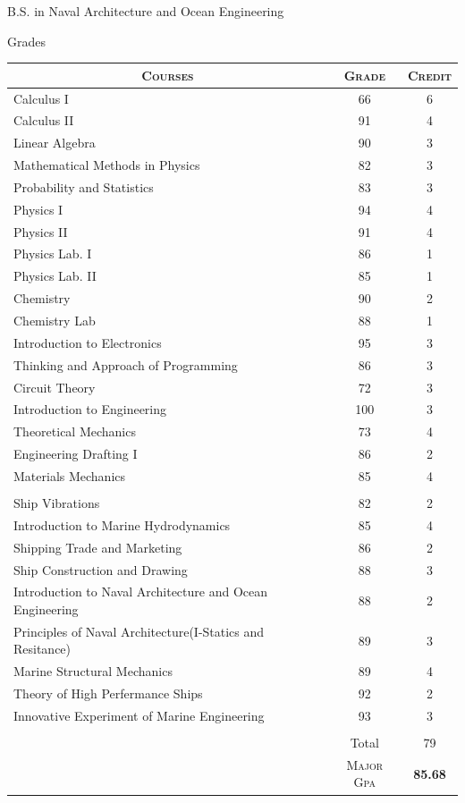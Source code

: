 \documentclass[a4paper,10pt]{article}
\begin{document}
\newpage
\par{\centering\Large \hypertarget{grds}{B.S. in Naval Architecture and Ocean Engineering}\par}\large{\centering Grades\par}\normalsize
\begin{center}
\begin{tabular}{lcc}
\multicolumn{1}{c}{\textsc{Courses}}&\textsc{Grade}&\textsc{Credit}\\ \hline
Calculus I	&66&	6\\
Calculus II	&91&	4\\
Linear Algebra	&90&	3\\
Mathematical Methods in Physics	&82&	3\\
Probability and Statistics	&83&	3\\
Physics I	&94& 4\\
Physics II	&91&	4\\
Physics Lab. I	&86&	1\\
Physics Lab. II &85&    1\\
Chemistry	&90&	2\\
Chemistry Lab   &88&    1\\
Introduction to Electronics	&95&	3\\ 
Thinking and Approach of Programming	&86&	3\\
Circuit Theory	&72&	3\\
Introduction to Engineering	&100&	3\\
Theoretical Mechanics	&73&	4\\ 
Engineering Drafting I	&86&	2\\
Materials Mechanics	&85&	4\\ \\
		
Ship Vibrations	&82&    2\\
Introduction to Marine Hydrodynamics	&85&    4\\
Shipping Trade and Marketing    &86&    2\\
Ship Construction and Drawing   &88&    3\\
Introduction to Naval Architecture and Ocean Engineering &88&   2\\
Principles of Naval Architecture(I-Statics and Resitance)   &89& 3\\
Marine Structural Mechanics &89&    4\\
Theory of High Perfermance Ships    &92&  2\\
Innovative Experiment of Marine Engineering &93& 3\\ \\
		& Total&79\\\cline{2-3}
&\textsc{Major Gpa}&\textbf{85.68}\\


\end{tabular}
\end{center}
\end{document}
